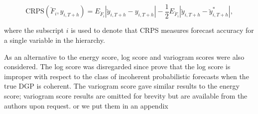\documentclass[graybox]{svmult}
\begin{document}
\begin{equation} \label{eq:24}
\text{CRPS}(\breve{F}_i,y_{i,T+h}) = E_{\breve{F}_i}|\breve{y}_{i,T+h}-y_{i,T+h}| - \frac{1}{2}E_{\breve{F}_i}|\breve{y}_{i,T+h}-\breve{y}^*_{i,T+h}|,
\end{equation}

where the subscript $i$ is used to denote that CRPS measures forecast accuracy for a single variable in the hierarchy.

As an alternative to the energy score, log score and variogram scores were also considered.  The log score was disregarded since \cite{Gamakumara2018} prove that the log score is improper with respect to the class of incoherent probabilistic forecasts when the true DGP is coherent.  The variogram score gave similar results to the energy score; variogram score results are omitted for brevity but are available from the authors upon request. {\color{red} or we put them in an appendix}


%
%
%
%
%
%
%
\end{document}
